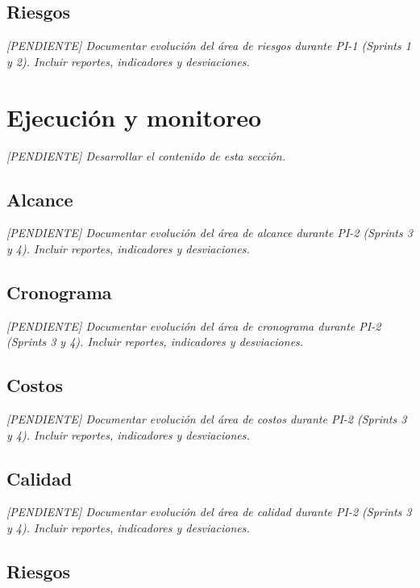 \documentclass[12pt,a4paper,oneside]{report}
\newcommand{\pendiente}[1]{\textit{[PENDIENTE] #1}}
\begin{document}
\subsection{Riesgos}\label{subsec:riesgos}

\pendiente{Documentar evolución del área de riesgos durante PI-1 (Sprints 1 y 2). Incluir reportes, indicadores y desviaciones.}

\section{Ejecución y monitoreo}\label{sec:ejecucion-y-monitoreo-2}

\textit{[PENDIENTE] Desarrollar el contenido de esta sección.}

\subsection{Alcance}\label{subsec:alcance-2}

\pendiente{Documentar evolución del área de alcance durante PI-2 (Sprints 3 y 4). Incluir reportes, indicadores y desviaciones.}

\subsection{Cronograma}\label{subsec:cronograma-2}

\pendiente{Documentar evolución del área de cronograma durante PI-2 (Sprints 3 y 4). Incluir reportes, indicadores y desviaciones.}

\subsection{Costos}\label{subsec:costos-2}

\pendiente{Documentar evolución del área de costos durante PI-2 (Sprints 3 y 4). Incluir reportes, indicadores y desviaciones.}

\subsection{Calidad}\label{subsec:calidad-2}

\pendiente{Documentar evolución del área de calidad durante PI-2 (Sprints 3 y 4). Incluir reportes, indicadores y desviaciones.}

\subsection{Riesgos}\label{subsec:riesgos-2}
\end{document}
